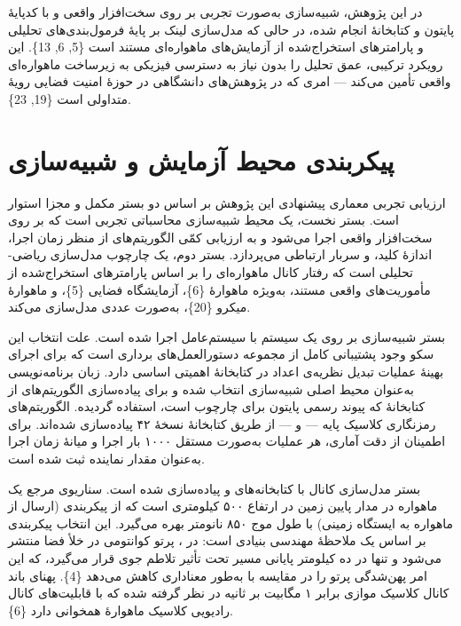 \documentclass[a4paper,14pt]{extreport}
\begin{document}
در این پژوهش، شبیه‌سازی  به‌صورت تجربی بر روی سخت‌افزار واقعی و با کدپایهٔ پایتون و کتابخانهٔ  انجام شده، در حالی که مدل‌سازی لینک  بر پایهٔ فرمول‌بندی‌های تحلیلی و پارامترهای استخراج‌شده از آزمایش‌های ماهواره‌ای مستند است \{5, 6, 13\}. این رویکرد ترکیبی، عمق تحلیل را بدون نیاز به دسترسی فیزیکی به زیرساخت  ماهواره‌ای واقعی تأمین می‌کند --- امری که در پژوهش‌های دانشگاهی در حوزهٔ امنیت فضایی رویهٔ متداولی است \{19, 23\}.

\section{پیکربندی محیط آزمایش و شبیه‌سازی}

ارزیابی تجربی معماری پیشنهادی این پژوهش بر اساس دو بستر مکمل و مجزا استوار است. بستر نخست، یک محیط شبیه‌سازی محاسباتی تجربی  است که بر روی سخت‌افزار واقعی اجرا می‌شود و به ارزیابی کمّی الگوریتم‌های  از منظر زمان اجرا، اندازهٔ کلید، و سربار ارتباطی می‌پردازد. بستر دوم، یک چارچوب مدل‌سازی ریاضی-تحلیلی  است که رفتار کانال  ماهواره‌ای را بر اساس پارامترهای استخراج‌شده از مأموریت‌های واقعی مستند، به‌ویژه ماهوارهٔ  \{6\}، آزمایشگاه فضایی  \{5\}، و ماهوارهٔ میکرو  \{20\}، به‌صورت عددی مدل‌سازی می‌کند.

بستر شبیه‌سازی  بر روی یک سیستم  با سیستم‌عامل  اجرا شده است. علت انتخاب این سکو وجود پشتیبانی کامل از مجموعه دستورالعمل‌های برداری  است که برای اجرای بهینهٔ عملیات تبدیل نظریه‌ی اعداد  در کتابخانهٔ  اهمیتی اساسی دارد. زبان برنامه‌نویسی  به‌عنوان محیط اصلی شبیه‌سازی انتخاب شده و برای پیاده‌سازی الگوریتم‌های  از کتابخانهٔ  که پیوند رسمی پایتون برای چارچوب  است، استفاده گردیده. الگوریتم‌های رمزنگاری کلاسیک پایه ---  و  --- از طریق کتابخانهٔ  نسخهٔ ۴۲ پیاده‌سازی شده‌اند. برای اطمینان از دقت آماری، هر عملیات به‌صورت مستقل ۱۰۰۰ بار اجرا و میانهٔ زمان اجرا  به‌عنوان مقدار نماینده ثبت شده است.

بستر مدل‌سازی کانال  با کتابخانه‌های  و  پیاده‌سازی شده است. سناریوی مرجع یک ماهواره در مدار پایین زمین در ارتفاع ۵۰۰ کیلومتری است که از پیکربندی  (ارسال از ماهواره به ایستگاه زمینی) با طول موج ۸۵۰ نانومتر بهره می‌گیرد. این انتخاب پیکربندی  بر اساس یک ملاحظهٔ مهندسی بنیادی است: در ، پرتو کوانتومی در خلأ فضا منتشر می‌شود و تنها در ده کیلومتر پایانی مسیر تحت تأثیر تلاطم جوی  قرار می‌گیرد، که این امر پهن‌شدگی پرتو را در مقایسه با  به‌طور معناداری کاهش می‌دهد \{4\}. پهنای باند کانال کلاسیک موازی برابر ۱ مگابیت بر ثانیه در نظر گرفته شده که با قابلیت‌های کانال رادیویی کلاسیک ماهوارهٔ  همخوانی دارد \{6\}.
\end{document}
